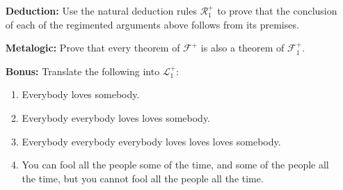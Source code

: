 \documentclass[a4paper, 11pt]{article} %
\renewcommand{\L}[0]{\mathcal{L}}
\begin{document}
\begin{enumerate}[leftmargin=1.2in,labelsep=.15in]
\begin{enumerate}[label=(\arabic*)]
	\end{enumerate}
\item[\bf Deduction:] Use the natural deduction rules $\mathcal{R}_1^+$ to prove that the conclusion of each of the regimented arguments above follows from its premises.
\item[\bf Metalogic:] Prove that every theorem of $\mathcal{F}^+$ is also a theorem of $\mathcal{F}^+_1$.
\item[\bf Bonus:] Translate the following into $\L_1^+$:
	\begin{enumerate}[label=(\arabic*)]\small
	\item Everybody loves somebody.
	\item Everybody everybody loves loves somebody.
	\item Everybody everybody everybody loves loves loves somebody.
	\item You can fool all the people some of the time, and some of the people all the time, but you cannot fool all the people all the time.
	\end{enumerate}
\end{enumerate}
\end{document}
